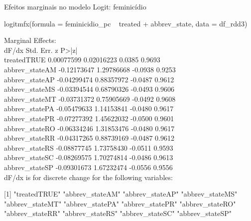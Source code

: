 \documentclass{beamer}
\begin{document}
\begin{frame}{Efeitos marginais no modelo Logit: feminicídio}
	\begin{tiny}
logitmfx(formula = feminicidio_pc ~ treated + abbrev_state, data = df_rdd3)

Marginal Effects:\\
dF/dx   Std. Err.       z  P>|z|\\
treatedTRUE     0.00077599  0.02016223  0.0385 0.9693\\
abbrev_stateAM -0.12173647  1.29786668 -0.0938 0.9253\\
abbrev_stateAP -0.04299474  0.88357972 -0.0487 0.9612\\
abbrev_stateMS -0.03394544  0.68790326 -0.0493 0.9606\\
abbrev_stateMT -0.03731372  0.75905669 -0.0492 0.9608\\
abbrev_statePA -0.05479633  1.14153841 -0.0480 0.9617\\
abbrev_statePR -0.07277392  1.45622032 -0.0500 0.9601\\
abbrev_stateRO -0.06334246  1.31853476 -0.0480 0.9617\\
abbrev_stateRR -0.04317265  0.88739169 -0.0487 0.9612\\
abbrev_stateRS -0.08877745  1.73758430 -0.0511 0.9593\\
abbrev_stateSC -0.08269575  1.70274814 -0.0486 0.9613\\
abbrev_stateSP -0.09301673  1.67232474 -0.0556 0.9556\\

dF/dx is for discrete change for the following variables:

[1] "treatedTRUE"    "abbrev_stateAM" "abbrev_stateAP" "abbrev_stateMS"\\
[5] "abbrev_stateMT" "abbrev_statePA" "abbrev_statePR" "abbrev_stateRO"\\
[9] "abbrev_stateRR" "abbrev_stateRS" "abbrev_stateSC" "abbrev_stateSP"\\
\end{tiny}
\end{frame}
\end{document}
